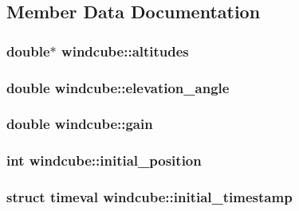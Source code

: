 \subsection{Member Data Documentation}
\hypertarget{classwindcube_a6080ff141d176b3bb7e0dbc655ed46e9}{
\subsubsection[{altitudes}]{\setlength{\rightskip}{0pt plus 5cm}double$\ast$ windcube\-::altitudes\hspace{0.3cm}{\ttfamily [private]}}}\label{classwindcube_a6080ff141d176b3bb7e0dbc655ed46e9}
\hypertarget{classwindcube_ada525fe40090dafeb8d7dae911ed9ac4}{
\subsubsection[{elevation\-\_\-angle}]{\setlength{\rightskip}{0pt plus 5cm}double windcube\-::elevation\-\_\-angle\hspace{0.3cm}{\ttfamily [private]}}}\label{classwindcube_ada525fe40090dafeb8d7dae911ed9ac4}
\hypertarget{classwindcube_a7c023ee8ccc3900b6544136f1e845e3f}{
\subsubsection[{gain}]{\setlength{\rightskip}{0pt plus 5cm}double windcube\-::gain\hspace{0.3cm}{\ttfamily [private]}}}\label{classwindcube_a7c023ee8ccc3900b6544136f1e845e3f}
\hypertarget{classwindcube_a283219a5fa65543bef16fdb3c8598260}{
\subsubsection[{initial\-\_\-position}]{\setlength{\rightskip}{0pt plus 5cm}int windcube\-::initial\-\_\-position\hspace{0.3cm}{\ttfamily [private]}}}\label{classwindcube_a283219a5fa65543bef16fdb3c8598260}
\hypertarget{classwindcube_aecb46d84c92acb6390ef5d33ba33957c}{
\subsubsection[{initial\-\_\-timestamp}]{\setlength{\rightskip}{0pt plus 5cm}struct timeval windcube\-::initial\-\_\-timestamp\hspace{0.3cm}{\ttfamily [private]}}}\label{classwindcube_aecb46d84c92acb6390ef5d33ba33957c}


